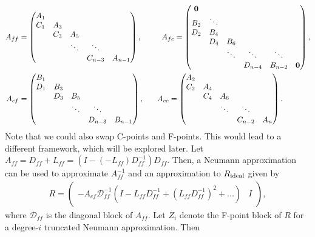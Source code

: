 \documentclass[a4paper,12pt]{article}
\begin{document}
\begin{align*}
A_{ff} & = 
\begin{pmatrix}
	A_{1} \\ 
	C_1 & A_3 \\
	& C_3 & A_5 \\
	& & \ddots & \ddots  \\
	& & & C_{n-3} & A_{n-1}
\end{pmatrix},
\hspace{6ex}
A_{fc} = 
\begin{pmatrix}
	 \mathbf{0} & \\
	B_2 & \ddots\\
	D_2 & B_4  \\
	& D_4 & B_6  \\
	& & \ddots & \ddots & \ddots\\
	& & & D_{n-4} & B_{n-2} &  \mathbf{0}
\end{pmatrix},
\\
A_{cf} & = 
\begin{pmatrix}
	B_{1} \\ 
	D_1 & B_3 \\
	& D_3 & B_5 \\
	&& \ddots & \ddots \\
	&& & D_{n-3} & B_{n-1}
\end{pmatrix},
\hspace{4ex}
A_{cc} = 
\begin{pmatrix}
	A_{2} \\ 
	C_2 & A_4 \\
	& C_4 & A_6 \\
	& & \ddots & \ddots  \\
	& & & C_{n-2} & A_{n}
\end{pmatrix}.
\end{align*}
%
Note that we could also swap C-points and F-points. This would lead to a different framework, which will be
explored later. Let $A_{ff} = D_{ff} + L_{ff} = (I - (-L_{ff})D_{ff}^{-1})D_{ff}$. Then, a Neumann approximation 
can be used to approximate $A_{ff}^{-1}$ and an approximation to $R_{\textnormal{ideal}}$ given by
%
\begin{align*}
R = \begin{pmatrix} -A_{cf}\mathcal{D}_{ff}^{-1}(I - L_{ff}D_{ff}^{-1} + (L_{ff}D_{ff}^{-1})^2 + ...) & I\end{pmatrix},
\end{align*}
%
where $\mathcal{D}_{ff}$ is the diagonal block of $A_{ff}$. 
Let $Z_i$ denote the F-point block of $R$ for a degree-$i$ truncated Neumann approximation. Then
\end{document}
